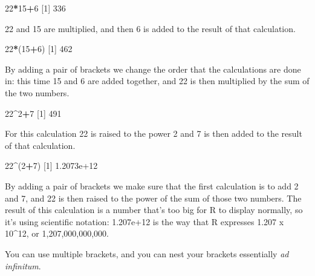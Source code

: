 \documentclass[
]{book}
\newenvironment{Shaded}{\begin{snugshade}}{\end{snugshade}}
\newcommand{\DecValTok}[1]{\textcolor[rgb]{0.00,0.00,0.81}{#1}}
\newcommand{\FloatTok}[1]{\textcolor[rgb]{0.00,0.00,0.81}{#1}}
\newcommand{\NormalTok}[1]{#1}
\newcommand{\OperatorTok}[1]{\textcolor[rgb]{0.81,0.36,0.00}{\textbf{#1}}}
\begin{document}
\begin{Shaded}
\begin{Highlighting}[]
\DecValTok{22}\OperatorTok{*}\DecValTok{15}\OperatorTok{+}\DecValTok{6}
\NormalTok{[}\DecValTok{1}\NormalTok{] }\DecValTok{336}
\end{Highlighting}
\end{Shaded}

22 and 15 are multiplied, and then 6 is added to the result of that calculation.

\begin{Shaded}
\begin{Highlighting}[]
\DecValTok{22}\OperatorTok{*}\NormalTok{(}\DecValTok{15}\OperatorTok{+}\DecValTok{6}\NormalTok{)}
\NormalTok{[}\DecValTok{1}\NormalTok{] }\DecValTok{462}
\end{Highlighting}
\end{Shaded}

By adding a pair of brackets we change the order that the calculations are done in: this time 15 and 6 are added together, and 22 is then multiplied by the sum of the two numbers.

\begin{Shaded}
\begin{Highlighting}[]
\DecValTok{22}\OperatorTok{^}\DecValTok{2}\OperatorTok{+}\DecValTok{7}
\NormalTok{[}\DecValTok{1}\NormalTok{] }\DecValTok{491}
\end{Highlighting}
\end{Shaded}

For this calculation 22 is raised to the power 2 and 7 is then added to the result of that calculation.

\begin{Shaded}
\begin{Highlighting}[]
\DecValTok{22}\OperatorTok{^}\NormalTok{(}\DecValTok{2}\OperatorTok{+}\DecValTok{7}\NormalTok{)}
\NormalTok{[}\DecValTok{1}\NormalTok{] }\FloatTok{1.2073e+12}
\end{Highlighting}
\end{Shaded}

By adding a pair of brackets we make sure that the first calculation is to add 2 and 7, and 22 is then raised to the power of the sum of those two numbers. The result of this calculation is a number that's too big for R to display normally, so it's using scientific notation: 1.207e+12 is the way that R expresses 1.207 x 10\^{}12, or 1,207,000,000,000.

You can use multiple brackets, and you can nest your brackets essentially \emph{ad infinitum}.
\end{document}
